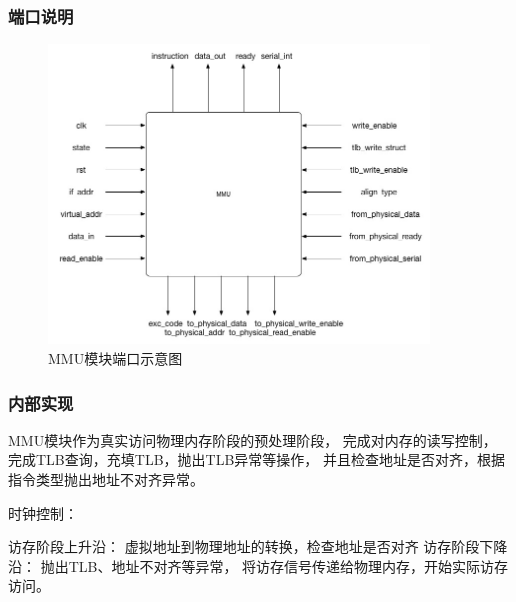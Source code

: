         \subsubsection{端口说明}
            
            \begin{figure}[!hbp]
                \centering
                \caption{MMU模块端口示意图}
                \includegraphics[width=0.9\textwidth]{chart/mmu.jpg}
            \end{figure}
        \subsubsection{内部实现}
            MMU模块作为真实访问物理内存阶段的预处理阶段，%
            完成对内存的读写控制，%
            完成TLB查询，充填TLB，抛出TLB异常等操作，%
            并且检查地址是否对齐，根据指令类型抛出地址不对齐异常。
            
            时钟控制：
            \begin{minipage}[t]{0.8\linewidth}
                访存阶段上升沿：%
                    虚拟地址到物理地址的转换，检查地址是否对齐%
                访存阶段下降沿：%
                    抛出TLB、地址不对齐等异常，%
                    将访存信号传递给物理内存，开始实际访存访问。%
            \end{minipage}
            
